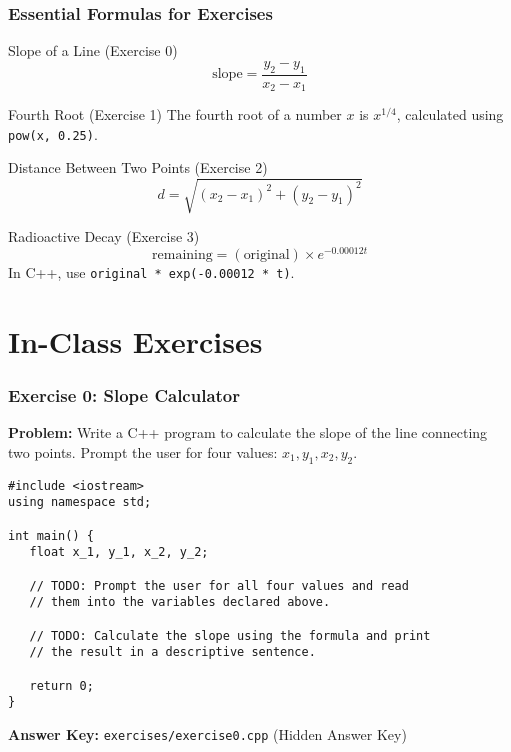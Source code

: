 \documentclass{beamer}
\begin{document}
\begin{frame}
\frametitle{Essential Formulas for Exercises}
\begin{block}{Slope of a Line (Exercise 0)}
$$ \text{slope} = \frac{y_2 - y_1}{x_2 - x_1} $$
\end{block}
\pause
\begin{block}{Fourth Root (Exercise 1)}
The fourth root of a number $x$ is $x^{1/4}$, calculated using \texttt{pow(x, 0.25)}.
\end{block}
\pause
\begin{block}{Distance Between Two Points (Exercise 2)}
$$ d = \sqrt{(x_2 - x_1)^2 + (y_2 - y_1)^2} $$
\end{block}
\pause
\begin{block}{Radioactive Decay (Exercise 3)}
$$ \text{remaining} = (\text{original}) \times e^{-0.00012t} $$
In C++, use \texttt{original * exp(-0.00012 * t)}.
\end{block}
\end{frame}

\section{In-Class Exercises}

\begin{frame}[fragile]
\frametitle{Exercise 0: Slope Calculator}
\textbf{Problem:} Write a C++ program to calculate the slope of the line connecting two points. Prompt the user for four values: $x_1, y_1, x_2, y_2$.

\begin{verbatim}
#include <iostream>
using namespace std;

int main() {
   float x_1, y_1, x_2, y_2;

   // TODO: Prompt the user for all four values and read
   // them into the variables declared above.

   // TODO: Calculate the slope using the formula and print
   // the result in a descriptive sentence.

   return 0;
}
\end{verbatim}
\vfill
\textbf{Answer Key:} \texttt{exercises/exercise0.cpp} (Hidden Answer Key)
\end{frame}
\end{document}
